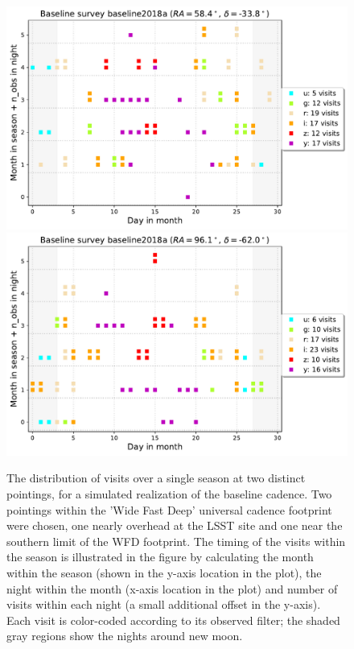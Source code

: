 \begin{figure}
\includegraphics[width=1.0\hsize,clip]{cadence_zenith}
\includegraphics[width=1.0\hsize,clip]{cadence_circumpolar}
\caption{The distribution of visits over a single season at two distinct pointings,
for a simulated realization of the baseline cadence. Two pointings within the 'Wide Fast Deep'
universal cadence footprint were chosen, one nearly overhead at the LSST site and one 
near the southern limit of the WFD footprint. The timing of the visits within the season
is illustrated in the figure by calculating the month within the season (shown in the y-axis 
location in the plot), the night within the month (x-axis location in the plot) and number of visits 
within each night (a small additional offset in the y-axis). Each visit is color-coded according to 
its observed filter; the shaded gray regions show the nights around new moon.}
\label{Fig:fieldCadence}
\end{figure}


